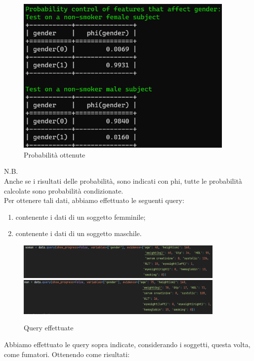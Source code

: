 \documentclass{article}
\begin{document}
\begin{figure}[H]
        \includegraphics[width=10.6cm]{notSmokeGen}
        \centering
        \caption{Probabilità ottenute}
        \centering
\end{figure}

\noindent
N.B.\\Anche se i risultati delle probabilità, sono indicati con phi, tutte le probabilità calcolate sono probabilità condizionate.\\

Per ottenere tali dati, abbiamo effettuato le seguenti query:
\begin{enumerate}
    \item contenente i dati di un soggetto femminile;
    \item contenente i dati di un soggetto maschile.
\end{enumerate}
\begin{figure}[H]
        \includegraphics[width=0.9\textwidth]{queryWomanNoTSmoke}
        \includegraphics[width=0.9\textwidth]{queryManNoTSmoke}
        \centering
        \caption{Query effettuate}
        \centering
\end{figure}
%

Abbiamo effettuato le query sopra indicate, considerando i soggetti, questa volta, come fumatori.
Ottenendo come risultati:
\end{document}
